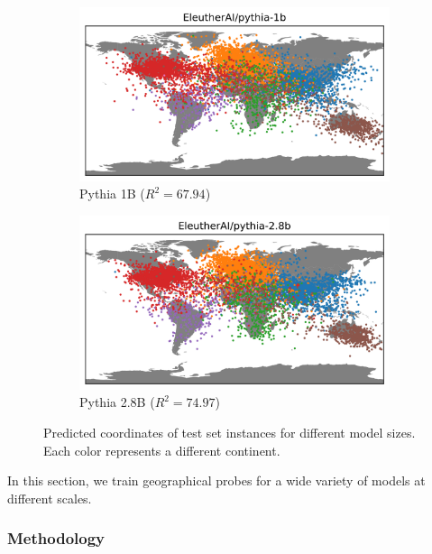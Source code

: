 \begin{figure}[h]
\begin{subfigure}[b]{0.43\textwidth}
         \includegraphics[trim={0 0 0 0.7cm},clip,width=\linewidth]{sources/part_1/geographical/imgs/pythia-1b.png}
         \caption{Pythia 1B ($R^2 = 67.94$)}
         \label{fig:1b_map}
    \end{subfigure}
    \begin{subfigure}[b]{0.43\textwidth}
         \includegraphics[trim={0 0 0 0.7cm},clip,width=\linewidth]{sources/part_1/geographical/imgs/pythia-2.8b.png}
         \caption{Pythia 2.8B ($R^2 = 74.97$)}
         \label{fig:2.8b_map}
    \end{subfigure}
    \caption{Predicted coordinates of test set instances for different model sizes. Each color represents a different continent.}
    \label{fig:maps}
\end{figure}

In this section, we train geographical probes for a wide variety of models at different scales.

\subsubsection{Methodology}

